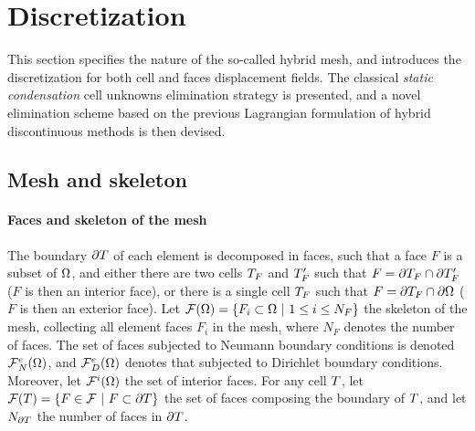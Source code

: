 %
%
\section{Discretization}
\label{sec-discretization}

This section specifies the nature of the so-called hybrid mesh,
and introduces the discretization for both cell and faces displacement fields.
The classical \textit{static condensation} cell unknowns elimination strategy is presented, and a novel elimination scheme
based on the previous Lagrangian formulation of hybrid discontinuous methods is then devised.

\subsection{Mesh and skeleton}

\paragraph{Faces and skeleton of the mesh}

The boundary $\partial T{}$ of each element is decomposed in faces, such
that a face $F$ is a subset of $\Omega$, and either there are two
cells $T_F$ and $T_F'$ such that $F = \partial T_F \cap \partial T_F'$
($F$ is then an interior face), or there is a single cell $T_F$ such
that $F = \partial T_F \cap \partial \Omega$ ($F$ is then an exterior face).
Let $\dHybridMesh(\bodyLag) = \{ F_i \subset \bodyLag \ \vert \ 1 \leq i
\leq N_{F} \}$ the skeleton of the mesh, collecting all element faces
$F_i$ in the mesh, where $N_{F}$ denotes the number of faces. The set of
faces subjected to Neumann boundary conditions is denoted
$\mathcal{F}{}_{N}^e(\Omega)$, and $\mathcal{F}{}_{D}^e(\Omega)$
denotes that subjected to Dirichlet boundary conditions. Moreover, let
$\mathcal{F}^i(\Omega)$ the set of interior faces. For any cell
$T$, let $\mathcal{F}(T) = \{ F \in \mathcal{F} \ \vert \ F
\subset \partial T \}$ the set of faces composing the boundary of $T$,
and let $N_{\partial T}$ the number of faces in $\partial T$.


